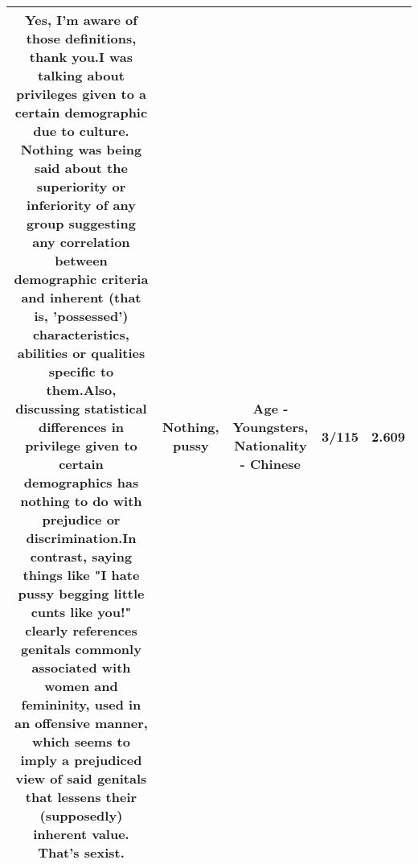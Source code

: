 \documentclass[11pt]{article}
\newlength\mylength
\begin{document}
\begin{center}
\begin{longtable}{|C{.65\mylength}|C{.30\mylength}|C{.12\mylength}|C{.12\mylength}|C{.12\mylength}|}
  \small {} Yes, I'm aware of those definitions, thank you.I was talking about privileges given to a certain demographic due to culture. \textbf{Nothing} was being said about the superiority or inferiority of any group suggesting any correlation between demographic criteria and inherent (that is, 'possessed') characteristics, abilities or qualities specific to them.Also, discussing statistical differences in privilege given to certain demographics has \textbf{nothing} to do with prejudice or discrimination.In contrast, saying things like "I hate \textbf{pussy} begging little cunts like you!" clearly references genitals commonly associated with women and femininity, used in an offensive manner, which seems to imply a prejudiced view of said genitals that lessens their (supposedly) inherent value. That's sexist.\normalsize   & Nothing, pussy & Age - Youngsters, Nationality - Chinese & 3/115 & 2.609 \\  \hline

\end{longtable}
\end{center}
\end{document}
